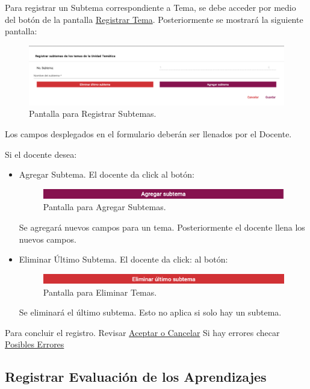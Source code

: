 Para registrar un Subtema correspondiente a Tema, se debe acceder por medio del botón  de la pantalla \hyperlink{RTema}{Registrar Tema}. Posteriormente se mostrará la siguiente pantalla:

\begin{figure}[!hbtp]
    \centering
    \includegraphics[width=0.7\linewidth]{images/SP6/RegistrarSubtema.png}
    \caption{Pantalla para Registrar Subtemas.} 
\end{figure}

Los campos desplegados en el formulario deberán ser llenados por el Docente.

Si el docente desea:
\begin{itemize}
    \item Agregar Subtema. El docente da click al botón:
    \begin{figure}[!hbtp]
    \centering
    \includegraphics[width=0.4\linewidth]{images/SP6/AgregarSubtema.png}
    \caption{Pantalla para Agregar Subtemas.} 
    \end{figure}
    Se agregará nuevos campos para un tema. Posteriormente el docente llena los nuevos campos.
    \item Eliminar Último Subtema. El docente da click: al botón:
    \begin{figure}[!hbtp]
    \centering
    \includegraphics[width=0.4\linewidth]{images/SP6/EliminarSubtema.png}
    \caption{Pantalla para Eliminar Temas.} 
    \end{figure}
    Se eliminará el último subtema. Esto no aplica si solo hay un subtema.
\end{itemize}

Para concluir el registro. Revisar \hyperlink{AceptarCancelar}{Aceptar o Cancelar}
Si hay errores checar \hyperlink{Errores}{Posibles Errores}

\pagebreak
\hypertarget{RegistrarEvalAprend}{\subsection{Registrar Evaluación de los Aprendizajes}}

